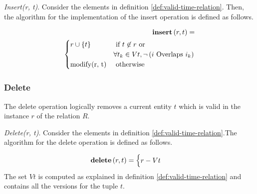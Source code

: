 \begin{definition}
 \emph{Insert(r, t)}.
Consider the elements in definition \ref{def:valid-time-relation}. Then, the algorithm for the implementation of the insert operation is defined as follows.
\end{definition}



\begin{align}
\label{eq:insert}
\INS \left(r, t\right) =\\
\begin{cases}
\nonumber
r \cup \lbrace t \rbrace
& \mbox{ if }  t \not \in r \mbox{ or }\\
\nonumber & \forall t_k \in Vt, \lnot \left(i \mbox{ Overlaps } i_k\right)\\
% 
\mbox{modify(r, t)} & \mbox{ otherwise }    %
\end{cases} 	
\end{align}

\subsubsection{\label{subsubsec:del}Delete}
The delete operation logically removes a current entity $t$ which is valid in the instance $r$ of the relation $R$.
\begin{definition}
 \emph{Delete(r, t)}.
Consider the elements in definition \ref{def:valid-time-relation}.The algorithm for the delete operation is defined as follows.
% 
\end{definition}


\begin{align}
\label{eq:delete}
\DEL \left(r, t\right) =
\begin{cases}
\nonumber
r - Vt
% 
% 
\end{cases} 	
\end{align}
The set $Vt$ is computed as explained in definition \ref{def:valid-time-relation} and contains all the versions for the tuple $t$.


